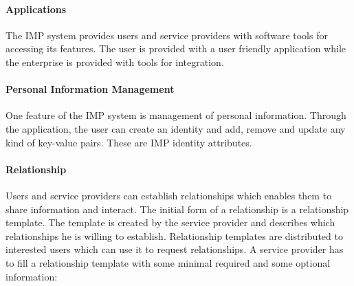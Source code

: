 \paragraph{Applications} The IMP system provides users and service providers with software tools for accessing its features. The user is provided with a user friendly application while the enterprise is provided with tools for integration.

\paragraph{Personal Information Management} One feature of the IMP system is management of personal information. Through the application, the user can create an identity and add, remove and update any kind of key-value pairs. These are IMP identity attributes.

\paragraph{Relationship} 

Users and service providers can establish relationships which enables them to share information and interact. The initial form of a relationship is a relationship template. The template is created by the service provider and describes which relationships he is willing to establish. Relationship templates are distributed to interested users which can use it to request relationships. A service provider has to fill a relationship template with some minimal required and some optional information:

